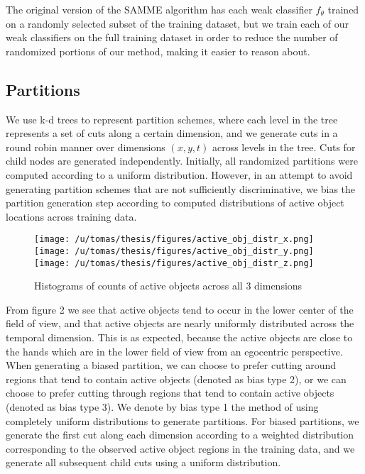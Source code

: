 \documentclass[10pt,twocolumn,letterpaper]{article}
\begin{document}
	The original version of the SAMME algorithm has each weak classifier
	$f_\theta$ trained on
	a randomly selected subset of the training dataset, but we train each of
	our weak classifiers on the full training dataset in order to reduce the
	number of randomized portions of our method, making it easier to
	reason about.

\subsection{Partitions}
	We use k-d trees to represent partition schemes, where each level in the tree
	represents a set of cuts along a certain dimension, and we generate cuts
  in a round robin manner over dimensions $(x, y, t)$ across levels in the
  tree.
  Cuts for child nodes are generated independently. 
	Initially, all randomized partitions were computed according to a uniform
	distribution. However, in an attempt to avoid generating partition schemes
	that are not sufficiently discriminative, we bias the partition generation
	step according to computed distributions of active object locations across
	training data. 

	\begin{figure}[t]
		\begin{center}
			  \texttt{[image: /u/tomas/thesis/figures/active\_obj\_distr\_x.png]}
			  \texttt{[image: /u/tomas/thesis/figures/active\_obj\_distr\_y.png]}
			  \texttt{[image: /u/tomas/thesis/figures/active\_obj\_distr\_z.png]}
		\end{center}
		   \caption{Histograms of counts of active objects across all 3 dimensions}
				\label{fig:long}
				\label{fig:onecol}
	\end{figure}
	
	From figure 2 we see that active objects tend to occur in the lower center
	of the field of view, and that active objects are nearly uniformly
	distributed across the temporal dimension. This is as expected, because
	the active objects are close to the hands which are in the lower field of
	view from an egocentric perspective. When generating a biased
	partition, we can choose to prefer cutting around regions that tend to
	contain active objects (denoted as bias type 2), or we can choose to prefer 
	cutting through regions that tend to contain active objects (denoted as bias type 3). 
	We denote by bias type 1 the method of using completely uniform
	distributions to generate partitions. For biased partitions, we generate
  the first cut along each dimension according to a weighted distribution
  corresponding to the observed active object regions in the training data,
  and we generate all subsequent child cuts using a uniform distribution.
  
\end{document}
